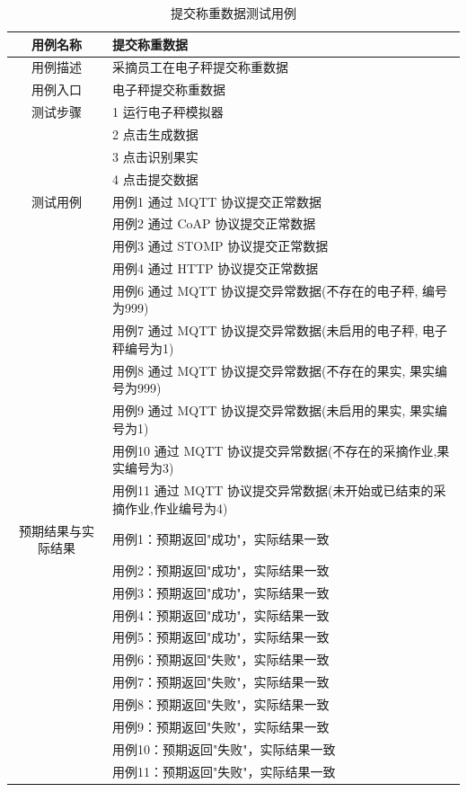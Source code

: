 \begin{longtable}[ht]{|c|p{8cm}|}
\caption{提交称重数据测试用例}
\label{tab:uc-weigh-submit-test}
\\
\hline
用例名称 & 提交称重数据 \\
\hline
用例描述 & 采摘员工在电子秤提交称重数据 \\
\hline
用例入口 & 电子秤提交称重数据 \\
\hline
测试步骤 & 1 运行电子秤模拟器 \\
& 2 点击生成数据 \\
& 3 点击识别果实 \\
& 4 点击提交数据 \\
\hline
测试用例 & 用例1 通过 MQTT 协议提交正常数据 \\
& 用例2 通过 CoAP 协议提交正常数据 \\
& 用例3 通过 STOMP 协议提交正常数据 \\
& 用例4 通过 HTTP 协议提交正常数据 \\
& 用例6 通过 MQTT 协议提交异常数据(不存在的电子秤, 编号为999) \\
& 用例7 通过 MQTT 协议提交异常数据(未启用的电子秤, 电子秤编号为1) \\
& 用例8 通过 MQTT 协议提交异常数据(不存在的果实, 果实编号为999) \\
& 用例9 通过 MQTT 协议提交异常数据(未启用的果实, 果实编号为1) \\
\hline
& 用例10 通过 MQTT 协议提交异常数据(不存在的采摘作业,果实编号为3) \\
& 用例11 通过 MQTT 协议提交异常数据(未开始或已结束的采摘作业,作业编号为4) \\
\hline
预期结果与实际结果 & 用例1：预期返回"成功"，实际结果一致 \\
& 用例2：预期返回"成功"，实际结果一致 \\
& 用例3：预期返回"成功"，实际结果一致 \\
& 用例4：预期返回"成功"，实际结果一致 \\
& 用例5：预期返回"成功"，实际结果一致 \\
& 用例6：预期返回"失败"，实际结果一致 \\
& 用例7：预期返回"失败"，实际结果一致 \\
& 用例8：预期返回"失败"，实际结果一致 \\
& 用例9：预期返回"失败"，实际结果一致 \\
& 用例10：预期返回"失败"，实际结果一致 \\
& 用例11：预期返回"失败"，实际结果一致 \\
\hline
\end{longtable}

